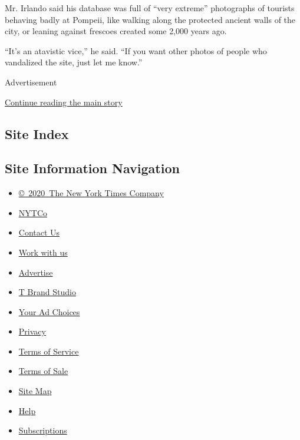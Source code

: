Mr. Irlando said his database was full of ``very extreme'' photographs
of tourists behaving badly at Pompeii, like walking along the protected
ancient walls of the city, or leaning against frescoes created some
2,000 years ago.

``It's an atavistic vice,'' he said. ``If you want other photos of
people who vandalized the site, just let me know.''

Advertisement

\protect\hyperlink{after-bottom}{Continue reading the main story}

\hypertarget{site-index}{%
\subsection{Site Index}\label{site-index}}

\hypertarget{site-information-navigation}{%
\subsection{Site Information
Navigation}\label{site-information-navigation}}

\begin{itemize}
\tightlist
\item
  \href{https://help.nytimes3xbfgragh.onion/hc/en-us/articles/115014792127-Copyright-notice}{©~2020~The
  New York Times Company}
\end{itemize}

\begin{itemize}
\tightlist
\item
  \href{https://www.nytco.com/}{NYTCo}
\item
  \href{https://help.nytimes3xbfgragh.onion/hc/en-us/articles/115015385887-Contact-Us}{Contact
  Us}
\item
  \href{https://www.nytco.com/careers/}{Work with us}
\item
  \href{https://nytmediakit.com/}{Advertise}
\item
  \href{http://www.tbrandstudio.com/}{T Brand Studio}
\item
  \href{https://www.nytimes3xbfgragh.onion/privacy/cookie-policy\#how-do-i-manage-trackers}{Your
  Ad Choices}
\item
  \href{https://www.nytimes3xbfgragh.onion/privacy}{Privacy}
\item
  \href{https://help.nytimes3xbfgragh.onion/hc/en-us/articles/115014893428-Terms-of-service}{Terms
  of Service}
\item
  \href{https://help.nytimes3xbfgragh.onion/hc/en-us/articles/115014893968-Terms-of-sale}{Terms
  of Sale}
\item
  \href{https://spiderbites.nytimes3xbfgragh.onion}{Site Map}
\item
  \href{https://help.nytimes3xbfgragh.onion/hc/en-us}{Help}
\item
  \href{https://www.nytimes3xbfgragh.onion/subscription?campaignId=37WXW}{Subscriptions}
\end{itemize}
